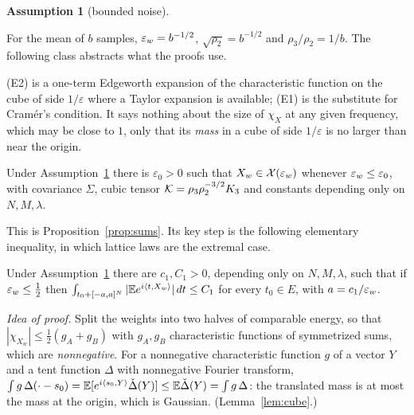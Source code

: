 \documentclass[anon,12pt]{colt2026}
\newtheorem{assumption}{Assumption}
\begin{document}
\begin{assumption}[bounded noise]\label{ass:B}\StmtAssB\end{assumption}

For the mean of $b$ samples, $\varepsilon_w=b^{-1/2}$, $\sqrt{\rho_2}=b^{-1/2}$ and $\rho_3/\rho_2=1/b$. The following class
abstracts what the proofs use.

\begin{definition}\label{def:class}\StmtClass\end{definition}

\textup{(E2)} is a one-term Edgeworth expansion of the characteristic function on the cube of side $1/\varepsilon$ where
a Taylor expansion is available; \textup{(E1)} is the substitute for Cram\'er's condition. It says nothing about the
size of $\chi_X$ at any given frequency, which may be close to $1$, only that its \emph{mass} in a cube of side
$1/\varepsilon$ is no larger than near the origin.

\begin{proposition}\label{prop:sums-main}
Under Assumption~\ref{ass:B} there is $\varepsilon_0>0$ such that $X_w\in\mathcal X(\varepsilon_w)$ whenever $\varepsilon_w\le\varepsilon_0$,
with covariance $\Sigma$, cubic tensor $\mathcal{K}=\rho_3\rho_2^{-3/2}K_3$ and constants depending only on $N,M,\lambda$.
\end{proposition}

This is Proposition~\ref{prop:sums}. Its key step is the following elementary inequality, in which lattice laws are
the extremal case.

\begin{lemma}\label{lem:cube-main}
Under Assumption~\ref{ass:B} there are $c_1,C_1>0$, depending only on $N,M,\lambda$, such that if $\varepsilon_w\le\frac12$ then
$\int_{t_0+[-a,a]^N}|\mathbb{E} e^{i\langle t, X_w\rangle}|\,dt\le C_1$ for every $t_0\in E$, with $a=c_1/\varepsilon_w$.
\end{lemma}

\noindent\emph{Idea of proof.} Split the weights into two halves of comparable energy, so that
$|\chi_{X_w}|\le\frac12(g_A+g_B)$ with $g_A,g_B$ characteristic functions of symmetrized sums, which are
\emph{nonnegative}. For a nonnegative characteristic function $g$ of a vector $Y$ and a tent function $\Delta$ with
nonnegative Fourier transform, $\int g\,\Delta(\cdot-s_0)=\mathbb{E}[e^{i\langle s_0, Y\rangle}\check\Delta(Y)]\le\mathbb{E}\check\Delta(Y)=\int g\,\Delta$:
the translated mass is at most the mass at the origin, which is Gaussian. (Lemma~\ref{lem:cube}.)
\end{document}
